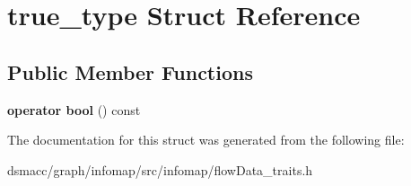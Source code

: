 \hypertarget{structtrue__type}{}\section{true\+\_\+type Struct Reference}
\label{structtrue__type}
\subsection*{Public Member Functions}
\begin{DoxyCompactItemize}
\item 
\mbox{\label{structtrue__type_a2dd1c50e207e417481e284cd7c258445}} 
{\bfseries operator bool} () const
\end{DoxyCompactItemize}


The documentation for this struct was generated from the following file\+:\begin{DoxyCompactItemize}
\item 
dsmacc/graph/infomap/src/infomap/flow\+Data\+\_\+traits.\+h\end{DoxyCompactItemize}

